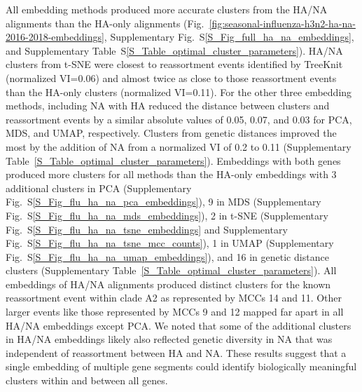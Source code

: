 \documentclass[webpdf,contemporary,large,single]{oup-authoring-template}%
\theoremstyle{thmstyleone}%
\theoremstyle{thmstyletwo}%
\theoremstyle{thmstylethree}%
\begin{document}
All embedding methods produced more accurate clusters from the HA/NA alignments than the HA-only alignments (Fig.~\ref{fig:seasonal-influenza-h3n2-ha-na-2016-2018-embeddings}, Supplementary Fig.~S\ref{S_Fig_full_ha_na_embeddings}, and Supplementary Table~S\ref{S_Table_optimal_cluster_parameters}).
HA/NA clusters from t-SNE were closest to reassortment events identified by TreeKnit (normalized VI=0.06) and almost twice as close to those reassortment events than the HA-only clusters (normalized VI=0.11).
For the other three embedding methods, including NA with HA reduced the distance between clusters and reassortment events by a similar absolute values of 0.05, 0.07, and 0.03 for PCA, MDS, and UMAP, respectively.
Clusters from genetic distances improved the most by the addition of NA from a normalized VI of 0.2 to 0.11 (Supplementary Table~\ref{S_Table_optimal_cluster_parameters}).
Embeddings with both genes produced more clusters for all methods than the HA-only embeddings with 3 additional clusters in PCA (Supplementary Fig.~S\ref{S_Fig_flu_ha_na_pca_embeddings}), 9 in MDS (Supplementary Fig.~S\ref{S_Fig_flu_ha_na_mds_embeddings}), 2 in t-SNE (Supplementary Fig.~S\ref{S_Fig_flu_ha_na_tsne_embeddings} and Supplementary Fig.~S\ref{S_Fig_flu_ha_na_tsne_mcc_counts}), 1 in UMAP (Supplementary Fig.~S\ref{S_Fig_flu_ha_na_umap_embeddings}), and 16 in genetic distance clusters (Supplementary Table~\ref{S_Table_optimal_cluster_parameters}).
All embeddings of HA/NA alignments produced distinct clusters for the known reassortment event within clade A2 \citep{Potter2019} as represented by MCCs 14 and 11.
Other larger events like those represented by MCCs 9 and 12 mapped far apart in all HA/NA embeddings except PCA.
We noted that some of the additional clusters in HA/NA embeddings likely also reflected genetic diversity in NA that was independent of reassortment between HA and NA.
These results suggest that a single embedding of multiple gene segments could identify biologically meaningful clusters within and between all genes.
\end{document}
